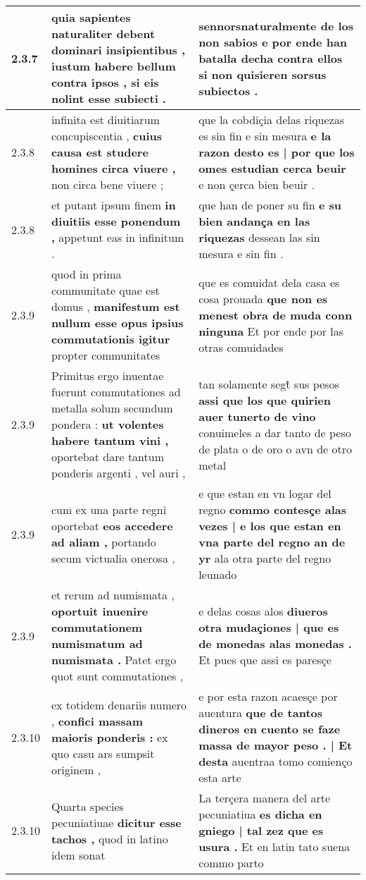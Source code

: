 \begin{tabular}{|p{1cm}|p{6.5cm}|p{6.5cm}|}
2.3.7 & quia sapientes naturaliter debent dominari insipientibus , \textbf{ iustum habere bellum contra ipsos , } si eis nolint esse subiecti . & sennorsnaturalmente de los non sabios \textbf{ e por ende han batalla decha contra ellos } si non quisieren sorsus subiectos . \\\hline
2.3.8 & infinita est diuitiarum concupiscentia , \textbf{ cuius causa est studere homines circa viuere , } non circa bene viuere ; & que la cobdiçia delas riquezas es sin fin e sin mesura \textbf{ e la razon desto es | por que los omes estudian cerca beuir } e non çerca bien beuir . \\\hline
2.3.8 & et putant ipsum finem \textbf{ in diuitiis esse ponendum , } appetunt eas in infinitum . & que han de poner su fin \textbf{ e su bien andança en las riquezas } dessean las sin mesura e sin fin . \\\hline
2.3.9 & quod in prima communitate quae est domus , \textbf{ manifestum est nullum esse opus ipsius commutationis igitur } propter communitates & que es comuidat dela casa es cosa prouada \textbf{ que non es menest obra de muda conn ninguna } Et por ende por las otras comuidades \\\hline
2.3.9 & Primitus ergo inuentae fuerunt commutationes ad metalla solum secundum pondera : \textbf{ ut volentes habere tantum vini , } oportebat dare tantum ponderis argenti , vel auri , & tan solamente segt̃ sus pesos \textbf{ assi que los que quirien auer tunerto de vino } conuimeles a dar tanto de peso de plata o de oro o avn de otro metal \\\hline
2.3.9 & cum ex una parte regni oportebat \textbf{ eos accedere ad aliam , } portando secum victualia onerosa , & e que estan en vn logar del regno \textbf{ commo contesçe alas vezes | e los que estan en vna parte del regno an de yr } ala otra parte del regno leunado \\\hline
2.3.9 & et rerum ad numismata , \textbf{ oportuit inuenire commutationem numismatum ad numismata . } Patet ergo quot sunt commutationes , & e delas cosas alos \textbf{ diueros otra mudaçiones | que es de monedas alas monedas . } Et pues que assi es paresçe \\\hline
2.3.10 & ex totidem denariis numero , \textbf{ confici massam maioris ponderis : } ex quo casu ars sumpsit originem , & e por esta razon acaesçe por auentura \textbf{ que de tantos dineros en cuento se faze massa de mayor peso . | Et desta } auentraa tomo comienço esta arte \\\hline
2.3.10 & Quarta species pecuniatiuae \textbf{ dicitur esse tachos , } quod in latino idem sonat & La terçera manera del arte pecuniatiua \textbf{ es dicha en gniego | tal zez que es usura . } Et en latin tato suena commo parto \\\hline

\end{tabular}
